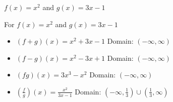 {$f(x) = x^2$ and $g(x) = 3x-1$}
{For $f(x) = x^2$ and $g(x) = 3x-1$

\begin{itemize}
\item $(f+g)(x) = x^2+3x-1$
      Domain: $(-\infty, \infty)$
\item $(f-g)(x) = x^2-3x+1$ 
      Domain:  $(-\infty, \infty)$
\item $(fg)(x) = 3x^3-x^2$
      Domain: $(-\infty, \infty)$
\item $\left(\frac{f}{g}\right)(x) = \frac{x^2}{3x-1}$
      Domain:  $\left(-\infty, \frac{1}{3} \right) \cup \left(\frac{1}{3}, \infty \right)$
\end{itemize}
}